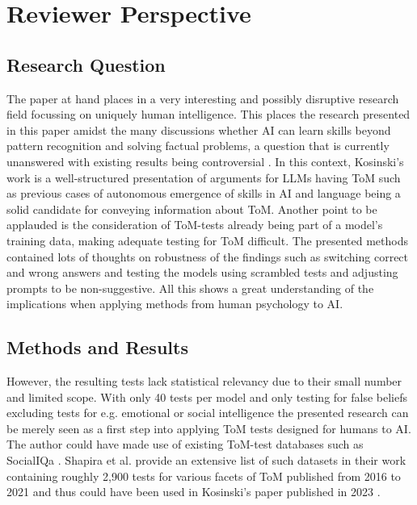 \section{Reviewer Perspective}
\subsection{Research Question}
The paper at hand places in a very interesting and possibly disruptive research field focussing on uniquely human intelligence. This places the research presented in this paper amidst the many discussions whether AI can learn skills beyond pattern recognition and solving factual problems, a question that is currently unanswered with existing results being controversial \cite{critics1}. In this context, Kosinski's work is a well-structured presentation of arguments for LLMs having ToM such as previous cases of autonomous emergence of skills in AI and language being a solid candidate for conveying information about ToM. Another point to be applauded is the consideration of ToM-tests already being part of a model's training data, making adequate testing for ToM difficult. The presented methods contained lots of thoughts on robustness of the findings such as switching correct and wrong answers and testing the models using scrambled tests and adjusting prompts to be non-suggestive. All this shows a great understanding of the implications when applying methods from human psychology to AI.

\subsection{Methods and Results}
However, the resulting tests lack statistical relevancy due to their small number and limited scope. With only 40 tests per model and only testing for false beliefs excluding tests for e.g. emotional or social intelligence the presented research can be merely seen as a first step into applying ToM tests designed for humans to AI. The author could have made use of existing ToM-test databases such as SocialIQa \cite{socialiqa}. Shapira et al. provide an extensive list of such datasets in their work containing roughly 2,900 tests for various facets of ToM published from 2016 to 2021 and thus could have been used in Kosinski's paper published in 2023 \cite{critics1}.
 
